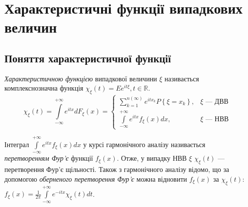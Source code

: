\section{Характеристичні функції випадкових величин}
\subsection{Поняття характеристичної функції}
\begin{definition}
    \emph{Характеристичною функцією} випадкової величини $\xi$
    називається комплекснозначна функція $\chi_\xi(t) = Ee^{it\xi}, t\in \mathbb{R}$.
    \begin{equation}\label{eq:char_func}
        \chi_\xi(t) = \int\limits_{-\infty}^{+\infty} e^{itx} dF_\xi(x) = \begin{cases}
            \sum\limits_{k=1}^{n(\infty)} e^{itx_k} P\left\{\xi = x_k\right\}, & \xi \text{ --- ДВВ} \\
            \int\limits_{-\infty}^{+\infty} e^{itx} f_\xi(x)dx, & \xi \text{ --- НВВ}
        \end{cases}
    \end{equation}
\end{definition}
Інтеграл $\int\limits_{-\infty}^{+\infty} e^{itx} f_\xi(x)dx$ у курсі
гармонічного аналізу називається \emph{перетворенням Фур'є} функції $f_\xi(x)$.
Отже, у випадку НВВ $\xi$ $\chi_\xi(t)$ --- перетворення Фур'є щільності.
Також з гармонічного аналізу відомо, що за допомогою \emph{оберненого перетворення Фур'є}
можна відновити $f_\xi(x)$ за $\chi_\xi(t)$: $f_\xi(x) = \frac{1}{2\pi}\int\limits_{-\infty}^{+\infty} e^{-itx} \chi_\xi(t)dt$.

